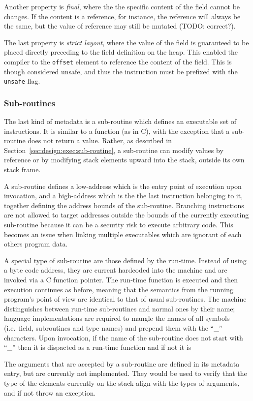 Another property is {\em final}, where the the specific content of the field
cannot be changes. If the content is a reference, for instance, the reference
will always be the same, but the value of reference may still be mutated (TODO:
correct?).

The last property is {\em strict layout}, where the value of the field is
guaranteed to be placed directly preceding to the field definition on the
heap. This enabled the compiler to the {\tt offset} element to reference the
content of the field. This is though considered unsafe, and thus the instruction
must be prefixed with the {\tt unsafe} flag.

\subsubsection{Sub-routines}

The last kind of metadata is a sub-routine which defines an executable set of
instructions. It is similar to a function (as in C), with the exception that a
sub-routine does not return a value. Rather, as described in
Section~\ref{sec:design:exec:sub-routine}, a sub-routine can modify values by
reference or by modifying stack elements upward into the stack, outside its own
stack frame.

A sub-routine defines a low-address which is the entry point of execution upon
invocation, and a high-address which is the the last instruction belonging to
it, together defining the address bounds of the sub-routine. Branching
instructions are not allowed to target addresses outside the bounds of the
currently executing sub-routine because it can be a security risk to execute
arbitrary code. This becomes an issue when linking multiple executables which
are ignorant of each others program data.

A special type of sub-routine are those defined by the run-time. Instead of
using a byte code address, they are current hardcoded into the machine and are
invoked via a C function pointer. The run-time function is executed and then
execution continues as before, meaning that the semantics from the running
program's point of view are identical to that of usual sub-routines. The machine
distinguishes between run-time sub-routines and normal ones by their name;
language implementations are required to mangle the names of all symbols
(i.e.~field, subroutines and type names) and prepend them with the ``_''
characters. Upon invocation, if the name of the sub-routine does not start with
``_'' then it is dispacted as a run-time function and if not it is

The arguments that are accepted by a sub-routine are defined in its metadata
entry, but are currently not implemented. They would be used to verify that the
type of the elements currently on the stack align with the types of arguments,
and if not throw an exception.


